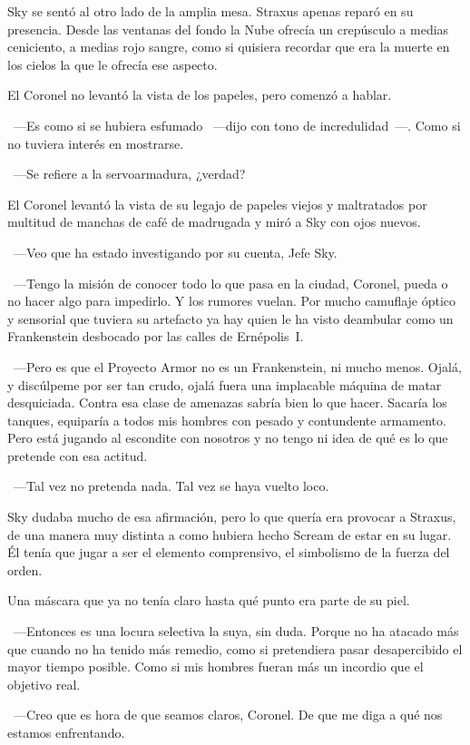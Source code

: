 Sky se sentó al otro lado de la amplia mesa. Straxus apenas reparó en su presencia. Desde las ventanas del fondo la Nube ofrecía un crepúsculo a medias ceniciento, a medias rojo sangre, como si quisiera recordar que era la muerte en los cielos la que le ofrecía ese aspecto.

El Coronel no levantó la vista de los papeles, pero comenzó a hablar.

~---Es como si se hubiera esfumado ~---dijo con tono de incredulidad~---. Como si no tuviera interés en mostrarse.

~---Se refiere a la servoarmadura, ¿verdad?

El Coronel levantó la vista de su legajo de papeles viejos y maltratados por multitud de manchas de café de madrugada y miró a Sky con ojos nuevos.

~---Veo que ha estado investigando por su cuenta, Jefe Sky.

~---Tengo la misión de conocer todo lo que pasa en la ciudad, Coronel, pueda o no hacer algo para impedirlo. Y los rumores vuelan. Por mucho camuflaje óptico y sensorial que tuviera su artefacto ya hay quien le ha visto deambular como un Frankenstein desbocado por las calles de Ernépolis~I.

~---Pero es que el Proyecto Armor no es un Frankenstein, ni mucho menos. Ojalá, y discúlpeme por ser tan crudo, ojalá fuera una implacable máquina de matar desquiciada. Contra esa clase de amenazas sabría bien lo que hacer. Sacaría los tanques, equiparía a todos mis hombres con pesado y contundente armamento. Pero está jugando al escondite con nosotros y no tengo ni idea de qué es lo que pretende con esa actitud.

~---Tal vez no pretenda nada. Tal vez se haya vuelto loco.

Sky dudaba mucho de esa afirmación, pero lo que quería era provocar a Straxus, de una manera muy distinta a como hubiera hecho Scream de estar en su lugar. Él tenía que jugar a ser el elemento comprensivo, el simbolismo de la fuerza del orden.

Una máscara que ya no tenía claro hasta qué punto era parte de su piel.

~---Entonces es una locura selectiva la suya, sin duda. Porque no ha atacado más que cuando no ha tenido más remedio, como si pretendiera pasar desapercibido el mayor tiempo posible. Como si mis hombres fueran más un incordio que el objetivo real.

~---Creo que es hora de que seamos claros, Coronel. De que me diga a qué nos estamos enfrentando.


